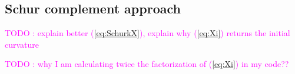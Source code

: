 \documentclass[a4paper,12pt,onecolumn]{article}
\newcommand{\NbulkT}{\vec{N}_{\Gamma,\Omega}^T}
\newcommand{\Nbulk}{\vec{N}_{\Gamma,\Omega}}
\newif\ifthesis
\begin{document}
\ifthesis
When we use the space (P1+P0) for the pressure, the algebraic system assumes the following form 
\begin{equation}
\begin{pmatrix}
\vec B_\Omega & \vec C_{\Omega,1} & \vec C_{\Omega,0} & -\gamma\,\Nbulk & 0 \\
\vec C^T_{\Omega,1} & 0 & 0 & 0 & 0 \\
\vec C^T_{\Omega,0} & 0 & 0 & 0 & 0 \\
\NbulkT & 0 & 0 & 0 & -\frac1{\tau_m}\,\vec{N}_\Gamma^T \\
0 & 0 & 0 & \vec{N}_\Gamma & \vec{A}_\Gamma 
\end{pmatrix} 
\begin{pmatrix} 
\vec U^{m+1} \\ 
P^{m+1}_1 \\
P^{m+1}_0 \\
\kappa^{m+1} \\ 
\delta\vec{X}^{m+1} 
\end{pmatrix}
=
\begin{pmatrix} 
\vec g \\
0 \\
0 \\
0 \\ 
-\vec{A}_\Gamma\,\vec{X}^{m} 
\end{pmatrix} \,,
\label{eq:lin_p1p0}
\end{equation}
where $\vec C_{\Omega,1}$ and $\vec C_{\Omega,0}$ are defined exactly as $\vec C_\Omega$ but the pressure function space is respectively P1 and P0.
\fi

\subsection{Schur complement approach}\label{sec:shur}

\textcolor{magenta}{TODO : explain better (\ref{eq:SchurkX}), explain why (\ref{eq:Xi}) returns the initial curvature}

\textcolor{magenta}{TODO : why I am calculating twice the factorization of (\ref{eq:Xi}) in my code??}
\end{document}
